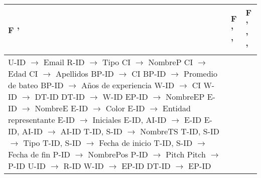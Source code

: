 \documentclass{report}
\begin{document}
    \begin{tabularx}{\textwidth}{|X|X|X|}
        \toprule
        \hfil F ' & \hfil F ' '  & \hfil F ' ' '  \\
        \midrule
        U-ID $\rightarrow$ Email \newline 
        R-ID $\rightarrow$ Tipo \newline 
        CI $\rightarrow$ NombreP \newline 
        CI $\rightarrow$ Edad \newline 
        CI $\rightarrow$ Apellidos \newline 
        BP-ID $\rightarrow$ CI \newline 
        BP-ID $\rightarrow$ Promedio de bateo \newline 
        BP-ID $\rightarrow$ Años de experiencia \newline 
        W-ID $\rightarrow$ CI \newline 
        W-ID $\rightarrow$ DT-ID \newline 
        DT-ID $\rightarrow$ W-ID \newline 
        EP-ID $\rightarrow$ NombreEP \newline 
        E-ID $\rightarrow$ NombreE \newline 
        E-ID $\rightarrow$ Color \newline 
        E-ID $\rightarrow$ Entidad representante \newline 
        E-ID $\rightarrow$ Iniciales \newline 
        E-ID, AI-ID $\rightarrow$ E-ID \newline 
        E-ID, AI-ID $\rightarrow$ AI-ID \newline 
        T-ID, S-ID $\rightarrow$ NombreTS \newline 
        T-ID, S-ID $\rightarrow$ Tipo \newline 
        T-ID, S-ID $\rightarrow$ Fecha de inicio \newline 
        T-ID, S-ID $\rightarrow$ Fecha de fin \newline 
        P-ID $\rightarrow$ NombrePos \newline 
        P-ID $\rightarrow$ Pitch \newline 
        Pitch $\rightarrow$ P-ID \newline 
        U-ID $\rightarrow$ R-ID \newline 
        W-ID $\rightarrow$ EP-ID \newline 
        DT-ID $\rightarrow$ EP-ID \newline 

\end{tabularx}
\end{document}
